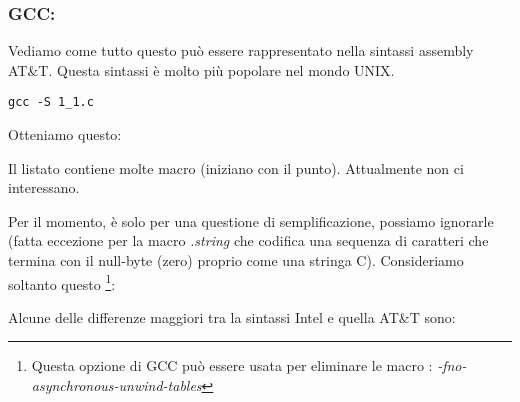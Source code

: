 \subsubsection{GCC: \ATTSyntax}
\label{ATT_syntax}

Vediamo come tutto questo può essere rappresentato nella sintassi assembly AT\&T.
Questa sintassi è molto più popolare nel mondo UNIX.

\begin{lstlisting}[caption=compiliamo in GCC 4.7.3]
gcc -S 1_1.c
\end{lstlisting}

Otteniamo questo:



Il listato contiene molte macro (iniziano con il punto). Attualmente non ci interessano.

Per il momento, è solo per una questione di semplificazione, possiamo ignorarle (fatta eccezione per la macro \emph{.string} che codifica una sequenza di caratteri che termina con il null-byte (zero) proprio come una stringa C). Consideriamo soltanto questo
\footnote{Questa opzione di GCC può essere usata per eliminare le macro : \emph{-fno-asynchronous-unwind-tables}}:



\myindex{\ATTSyntax}
\myindex{\IntelSyntax}
Alcune delle differenze maggiori tra la sintassi Intel e quella AT\&T sono:

